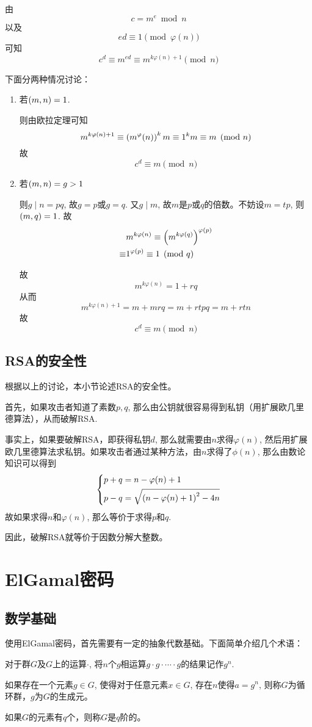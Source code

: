 \begin{prove}
由
\[c=m^e\bmod{n}\]
以及
\[ed\equiv 1\pmod{\varphi(n)}\]
可知
\begin{equation}
c^d\equiv m^{ed}\equiv m^{k\varphi(n)+1}\pmod{n}
\end{equation}

下面分两种情况讨论：
\begin{enumerate}
	\item 若$\left( {m, n}\right) = 1$.\par
	则由欧拉定理可知
	\[m^{k\varphi(n)+1}\equiv \left( {m^\varphi(n)}\right)^km\equiv 1^km\equiv m\pmod{n}\]
	故
	\[c^d\equiv m\pmod{n}\]
	\item 若$\left( {m, n}\right)=g>1$\par
	则$g\mid n=pq$, 故$g=p$或$g=q$. 又$g\mid m$, 故$m$是$p$或$q$的倍数。不妨设$m=tp$, 则$\left( {m, q}\right)=1$. 故
	\begin{align*}
	&m^{k\varphi(n)}\equiv\left( {m^{k\varphi(q)}}\right)^{\varphi(p)}\\
	\equiv&1^{\varphi(p)}\equiv 1\pmod{q}
	\end{align*}

	故
	\[m^{k\varphi(n)}=1+rq\]
	从而
	\[m^{k\varphi(n)+1}=m+mrq=m+rtpq=m+rtn\]
	故
	\[c^d\equiv m\pmod{n}\]
\end{enumerate}
\end{prove}
\subsection{RSA的安全性}
根据以上的讨论，本小节论述RSA的安全性。\par
首先，如果攻击者知道了素数$p, q$, 那么由公钥就很容易得到私钥（用扩展欧几里德算法），从而破解RSA.\par
事实上，如果要破解RSA，即获得私钥$d$, 那么就需要由$n$求得$\varphi(n)$, 然后用扩展欧几里德算法求私钥。如果攻击者通过某种方法，由$n$求得了$\phi(n)$, 那么由数论知识可以得到
\[\begin{dcases}p+q=n-\varphi(n)+1\\p-q=\sqrt{\left( {n-\varphi(n)+1}\right)^2-4n}\end{dcases}\]
故如果求得$n$和$\varphi(n)$, 那么等价于求得$p$和$q$.\par
因此，破解RSA就等价于因数分解大整数。
\section{ElGamal密码}
\subsection{数学基础}
使用ElGamal密码，首先需要有一定的抽象代数基础。下面简单介绍几个术语：\par
对于群$G$及$G$上的运算$\cdot$, 将$n$个$g$相运算$g\cdot g\cdot \cdots \cdot g$的结果记作$g^n$.\par
如果存在一个元素$g\in G$, 使得对于任意元素$x\in G$, 存在$n$使得$a=g^n$, 则称$G$为循环群，$g$为$G$的生成元。\par
如果$G$的元素有$q$个，则称$G$是$q$阶的。
